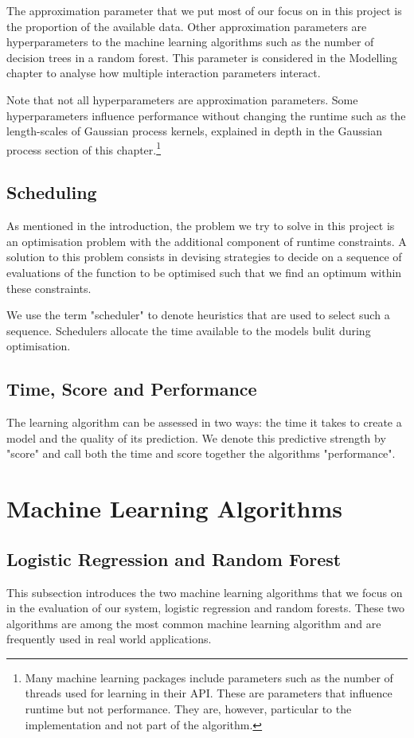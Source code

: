 \documentclass[a4paper,12pt,twoside,openright]{report}
\begin{document}
The approximation parameter that we put most of our focus on in this project is the proportion of the available data. Other approximation parameters are hyperparameters to the machine learning algorithms such as the number of decision trees in a random forest. This parameter is considered in the Modelling chapter to analyse how multiple interaction parameters interact.

Note that not all hyperparameters are approximation parameters. Some hyperparameters influence performance without changing the runtime such as the length-scales of Gaussian process kernels, explained in depth in the Gaussian process section of this chapter.\footnote{Many machine learning packages include parameters such as the number of threads used for learning in their API. These are parameters that influence runtime but not performance. They are, however, particular to the implementation and not part of the algorithm.}

\subsection{Scheduling}
As mentioned in the introduction, the problem we try to solve in this project is an optimisation problem with the additional component of runtime constraints. A solution to this problem consists in devising strategies to decide on a sequence of evaluations of the function to be optimised such that we find an optimum within these constraints. 

We use the term "scheduler" to denote heuristics that are used to select such a sequence. Schedulers allocate the time available to the models bulit during optimisation.

\subsection{Time, Score and Performance}
The learning algorithm can be assessed in two ways: the time it takes to create a model and the quality of its prediction. We denote this predictive strength by "score" and call both the time and score together the algorithms "performance".

\section{Machine Learning Algorithms}
\subsection{Logistic Regression and Random Forest}
This subsection introduces the two machine learning algorithms that we focus on in the evaluation of our system, logistic regression and random forests. These two algorithms are among the most common machine learning algorithm and are frequently used in real world applications.
\end{document}
